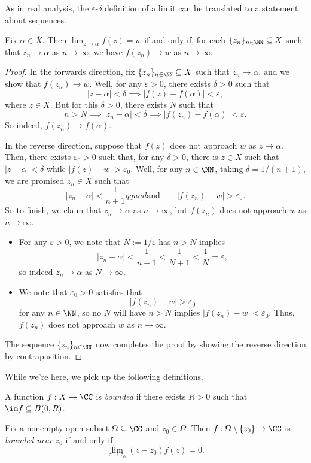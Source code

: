 As in real analysis, the $\varepsilon$-$\delta$ definition of a limit can be translated to a statement about sequences.
\begin{proposition} \label{prop:altlimit}
	Fix $\alpha\in\overline X$. Then $\lim_{z\to\alpha}f(z)=w$ if and only if, for each $\{z_n\}_{n\in\NN}\subseteq X$ such that $z_n\to\alpha$ as $n\to\infty$, we have $f(z_n)\to w$ as $n\to\infty$.
\end{proposition}
\begin{proof}
	In the forwards direction, fix $\{z_n\}_{n\in\NN}\subseteq X$ such that $z_n\to\alpha$, and we show that $f(z_n)\to w$. Well, for any $\varepsilon>0$, there exists $\delta>0$ such that
	\[|z-\alpha|<\delta\implies|f(z)-f(\alpha)|<\varepsilon,\]
	where $z\in X$. But for this $\delta>0$, there exists $N$ such that
	\[n>N\implies|z_n-\alpha|<\delta\implies|f(z_n)-f(\alpha)|<\varepsilon.\]
	So indeed, $f(z_n)\to f(\alpha)$.

	In the reverse direction, suppose that $f(z)$ does not approach $w$ as $z\to\alpha$. Then, there exists $\varepsilon_0>0$ such that, for any $\delta>0$, there is $z\in X$ such that $|z-\alpha|<\delta$ while $|f(z)-w|>\varepsilon_0$. Well, for any $n\in\NN$, taking $\delta=1/(n+1)$, we are promised $z_n\in X$ such that
	\[|z_n-\alpha|<\frac1{n+1}qquad\text{and}\qquad|f(z_n)-w|>\varepsilon_0.\]
	So to finish, we claim that $z_n\to\alpha$ as $n\to\infty$, but $f(z_n)$ does not approach $w$ as $n\to\infty$.
	\begin{itemize}
		\item For any $\varepsilon>0$, we note that $N:=1/\varepsilon$ has $n>N$ implies
		\[|z_n-\alpha|<\frac1{n+1}<\frac1{N+1}<\frac1N=\varepsilon,\]
		so indeed $z_n\to\alpha$ as $N\to\infty$.
		\item We note that $\varepsilon_0>0$ satisfies that
		\[|f(z_n)-w|>\varepsilon_0\]
		for any $n\in\NN$, so no $N$ will have $n>N$ implies $|f(z_n)-w|<\varepsilon_0$. Thus, $f(z_n)$ does not approach $w$ as $n\to\infty$.
	\end{itemize}
	The sequence $\{z_n\}_{n\in\NN}$ now completes the proof by showing the reverse direction by contraposition.
\end{proof}

While we're here, we pick up the following definitions.
\begin{definition}[Bounded]
	A function $f:X\to\CC$ is \textit{bounded} if there exists $R>0$ such that $\im f\subseteq B(0,R)$.
\end{definition}
\begin{definition}
	Fix a nonempty open subset $\Omega\subseteq\CC$ and $z_0\in\Omega$. Then $f:\Omega\setminus\{z_0\}\to\CC$ is \textit{bounded near} $z_0$ if and only if
	\[\lim_{z\to z_0}(z-z_0)f(z)=0.\]
\end{definition}

